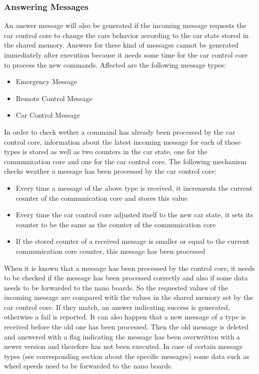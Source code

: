 \subsubsection{Answering Messages}
An answer message will also be generated if the incoming message requests the car control core to change the cars behavior according to the 
car state stored in the shared memory. Answers for these kind of messages cannot be generated immediately after execution because it needs some time 
for the car control core to process the new commands. Affected are the following message types:
\begin{itemize}
	\item Emergency Message
	\item Remote Control Message
	\item Car Control Message
\end{itemize}
In order to check wether a command has already been processed by the car control core, information about the latest incoming message for each of those 
types is stored as well as two counters in the car state, one for the communication core and one for the car control core. The following mechanism checks weather a message has been processed by the car control core:
\begin{itemize}
	\item Every time a message of the above type is received, it increments the current counter of the communication core and stores this value
	\item Every time the car control core adjusted itself to the new car state, it sets its counter to be the same as the counter of the communication core
	\item If the stored counter of a received message is smaller or equal to the current communication core counter, this message has been processed
\end{itemize}
When it is known that a message has been processed by the control core, it needs to be checked if the message has been processed correctly and also if some data needs to be forwarded to the nano boards.
So the requested values of the incoming message are compared with the values in the shared memory set by the car control core. If they match, an answer indicating success is generated, otherwise a fail is reported. It can also happen that a new message of a type is received before the old one has been processed. Then the old message is deleted and answered with a flag indicating the message has been overwritten with a newer version and therefore has not been executed. In case of certain message types (see corresponding section about the specific messages) some data such as wheel speeds need to be forwarded to the nano boards.





